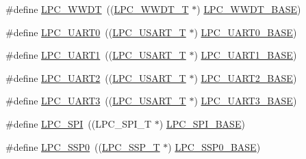 \begin{DoxyCompactItemize}
\item 
\#define \hyperlink{group__PERIPH__175X__6X__BASE_ga235e068b1412366044449dba68194c55}{L\-P\-C\-\_\-\-W\-W\-D\-T}~((\hyperlink{structLPC__WWDT__T}{L\-P\-C\-\_\-\-W\-W\-D\-T\-\_\-\-T}             $\ast$) \hyperlink{group__PERIPH__407X__8X__BASE_ga9b83c39ba53f9c9e87974984c96e35de}{L\-P\-C\-\_\-\-W\-W\-D\-T\-\_\-\-B\-A\-S\-E})
\item 
\#define \hyperlink{group__PERIPH__175X__6X__BASE_ga6ba29f0f9b8af2f72e303533185bcc82}{L\-P\-C\-\_\-\-U\-A\-R\-T0}~((\hyperlink{structLPC__USART__T}{L\-P\-C\-\_\-\-U\-S\-A\-R\-T\-\_\-\-T}            $\ast$) \hyperlink{group__PERIPH__407X__8X__BASE_gaa96fb70405a1298b350fc6f0ad0af997}{L\-P\-C\-\_\-\-U\-A\-R\-T0\-\_\-\-B\-A\-S\-E})
\item 
\#define \hyperlink{group__PERIPH__175X__6X__BASE_ga83ea0dab4dcb7411c2e1de20050a4d2d}{L\-P\-C\-\_\-\-U\-A\-R\-T1}~((\hyperlink{structLPC__USART__T}{L\-P\-C\-\_\-\-U\-S\-A\-R\-T\-\_\-\-T}            $\ast$) \hyperlink{group__PERIPH__407X__8X__BASE_ga18e8f96b25e3f343bdd7ba552ae7a617}{L\-P\-C\-\_\-\-U\-A\-R\-T1\-\_\-\-B\-A\-S\-E})
\item 
\#define \hyperlink{group__PERIPH__175X__6X__BASE_gac8badf231948fc9216d416c71a34e924}{L\-P\-C\-\_\-\-U\-A\-R\-T2}~((\hyperlink{structLPC__USART__T}{L\-P\-C\-\_\-\-U\-S\-A\-R\-T\-\_\-\-T}            $\ast$) \hyperlink{group__PERIPH__407X__8X__BASE_ga8c3873ab74db743465b038c74b365281}{L\-P\-C\-\_\-\-U\-A\-R\-T2\-\_\-\-B\-A\-S\-E})
\item 
\#define \hyperlink{group__PERIPH__175X__6X__BASE_ga61c2bf57d66b50108cdec6878f9e8ee5}{L\-P\-C\-\_\-\-U\-A\-R\-T3}~((\hyperlink{structLPC__USART__T}{L\-P\-C\-\_\-\-U\-S\-A\-R\-T\-\_\-\-T}            $\ast$) \hyperlink{group__PERIPH__407X__8X__BASE_gac8dc517d5e03d4ca7666c18c89d5052e}{L\-P\-C\-\_\-\-U\-A\-R\-T3\-\_\-\-B\-A\-S\-E})
\item 
\#define \hyperlink{group__PERIPH__175X__6X__BASE_ga9b593f008d0061052e90a8865d702ce5}{L\-P\-C\-\_\-\-S\-P\-I}~((L\-P\-C\-\_\-\-S\-P\-I\-\_\-\-T              $\ast$) \hyperlink{group__PERIPH__175X__6X__BASE_gaf611188188574ba805b6de71acc88c6c}{L\-P\-C\-\_\-\-S\-P\-I\-\_\-\-B\-A\-S\-E})
\item 
\#define \hyperlink{group__PERIPH__175X__6X__BASE_gac213e0325a8e8a972bd2e0dd6ccf353c}{L\-P\-C\-\_\-\-S\-S\-P0}~((\hyperlink{structLPC__SSP__T}{L\-P\-C\-\_\-\-S\-S\-P\-\_\-\-T}              $\ast$) \hyperlink{group__PERIPH__407X__8X__BASE_ga53fb1af80b541545988f2a966681abfd}{L\-P\-C\-\_\-\-S\-S\-P0\-\_\-\-B\-A\-S\-E})
\item 

\end{DoxyCompactItemize}
